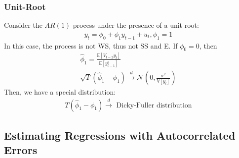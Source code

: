 \subsubsection{Unit-Root}

Consider the $AR(1)$ process under the presence of a unit-root:
\begin{gather*}
    y_t = \phi_0 + \phi_1 y_{t-1} + u_t, \phi_1 = 1
\end{gather*}
In this case, the process is not WS, thus not SS and E.
If $\phi_0 = 0$, then 
\begin{gather*}
    \hat{\phi}_1 = \frac{\mathbb{E}[V_{t-2} y_t]}{\mathbb{E}[y_{t-1}^2]} \\
    \sqrt{T}(\hat{\phi}_1 - \phi_1) \overset{d}{\rightarrow} \mathcal{N}\left(0, \frac{\sigma^2}{\mathbb{V}[y_t]}\right) 
\end{gather*}
Then, we have a special distribution:
\begin{gather*}
    T(\hat{\phi}_1 - \phi_1) \overset{d}{\rightarrow}  \text{ Dicky-Fuller distribution}
\end{gather*}

\subsection{Estimating Regressions with Autocorrelated Errors}

